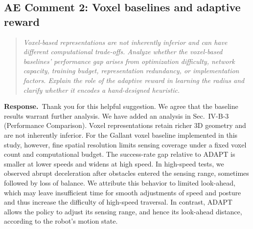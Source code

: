 \documentclass[11pt]{article}
\newenvironment{reviewcomment}{\begin{quote}\color{reviewblue}\itshape}{\end{quote}}
\newcommand{\Response}{\par\noindent\textbf{Response.}\ }
\begin{document}
\subsection*{AE Comment 2: Voxel baselines and adaptive reward}
\begin{reviewcomment}
Voxel-based representations are not inherently inferior and can have different computational trade-offs. Analyze whether the voxel-based baselines' performance gap arises from optimization difficulty, network capacity, training budget, representation redundancy, or implementation factors. Explain the role of the adaptive reward in learning the radius and clarify whether it encodes a hand-designed heuristic.
\end{reviewcomment}
\Response Thank you for this helpful suggestion. We agree that the baseline results warrant further analysis. We have added an analysis in Sec.~IV-B-3 (Performance Comparison). Voxel representations retain richer 3D geometry and are not inherently inferior. For the Gallant voxel baseline implemented in this study, however, fine spatial resolution limits sensing coverage under a fixed voxel count and computational budget. The success-rate gap relative to ADAPT is smaller at lower speeds and widens at high speed. In high-speed tests, we observed abrupt deceleration after obstacles entered the sensing range, sometimes followed by loss of balance. We attribute this behavior to limited look-ahead, which may leave insufficient time for smooth adjustments of speed and posture and thus increase the difficulty of high-speed traversal. In contrast, ADAPT allows the policy to adjust its sensing range, and hence its look-ahead distance, according to the robot's motion state.
\end{document}
